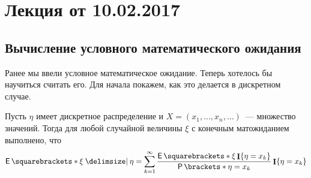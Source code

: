 \section{Лекция от 10.02.2017}
\subsection{Вычисление условного математического ожидания}
Ранее мы ввели условное математическое ожидание. Теперь хотелось бы научиться считать его. Для начала покажем, как это делается в дискретном случае.
\begin{theorem}
	Пусть \(\eta\) имеет дискретное распределение и \(X = (x_1, \dots, x_n, 
	\dots)\)~--- множество значений. Тогда для любой случайной величины \(\xi\) с конечным матожиданием
	выполнено, что
	\[
		\E{\xi \given \eta} = \sum_{k = 1}^{\infty} 
		\frac{\E{\xi\I\{\eta = x_{k}\}}}{\Pr{\eta = x_{k}}} 
		\I\{\eta = x_{k}\}
	\]
\end{theorem}
